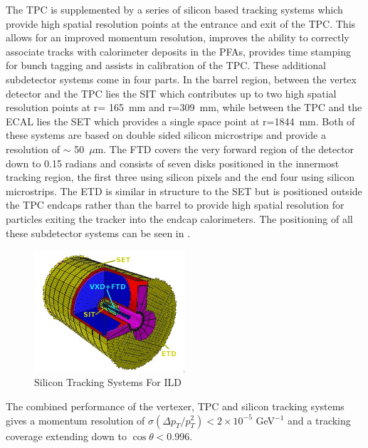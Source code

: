 The \ac{TPC} is supplemented by a series of silicon based tracking systems which provide high spatial resolution points at the entrance and exit of the TPC. This allows for an improved momentum resolution, improves the ability to correctly associate tracks with calorimeter deposits in the \ac{PFA}s, provides time stamping for bunch tagging and assists in calibration of the \ac{TPC}. These additional subdetector systems come in four parts. In the barrel region, between the vertex detector and the \ac{TPC} lies the \ac{SIT} which contributes up to two high spatial resolution points at r= 165~mm and r=309~mm, while between the \ac{TPC} and the \ac{ECAL} lies the \ac{SET} which provides a single space point at r=1844~mm. Both of these systems are based on double sided silicon microstrips and provide a resolution of $\sim$ 50~$\mu$m. The \ac{FTD} covers the very forward region of the detector down to 0.15 radians and consists of seven disks positioned in the innermost tracking region, the first three using silicon pixels and the end four using silicon microstrips. The \ac{ETD} is similar in structure to the \ac{SET} but is positioned outside the \ac{TPC} endcaps rather than the barrel to provide high spatial resolution for particles exiting the tracker into the endcap calorimeters. The positioning of all these subdetector systems can be seen in .

\begin{figure}
  \centering
  \includegraphics[width=0.5\textwidth,keepaspectratio]{Experiments/fig/SiliconTrackers}
  \caption[Silicon Tracking Systems For ILD]{Silicon Tracking Systems For ILD \cite{ILD}}
  \label{fig:silicontracking}
\end{figure}

The combined performance of the vertexer, \ac{TPC} and silicon tracking systems gives a momentum resolution of $\sigma(\Delta p_T/ p_{T}^2) < 2 \times 10^{-5}$ GeV$^{-1}$ and a tracking coverage extending down to $\cos\theta<$0.996.


